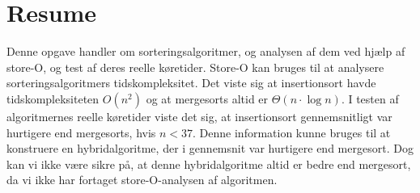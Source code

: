 \chapter*{Resume}
\label{ch:Resume}

Denne opgave handler om sorteringsalgoritmer, og analysen af dem ved hjælp af store-O, og test af deres reelle køretider. Store-O kan bruges til at analysere sorteringsalgoritmers tidskompleksitet. Det viste sig at insertionsort havde tidskompleksiteten $O(n^2)$ og at mergesorts altid er $\Theta (n \cdot \log n)$. I testen af algoritmernes reelle køretider viste det sig, at insertionsort gennemsnitligt var hurtigere end mergesorts, hvis $n < 37$. Denne information kunne bruges til at konstruere en hybridalgoritme, der i gennemsnit var hurtigere end mergesort. Dog kan vi ikke være sikre på, at denne hybridalgoritme altid er bedre end mergesort, da vi ikke har fortaget store-O-analysen af algoritmen.
